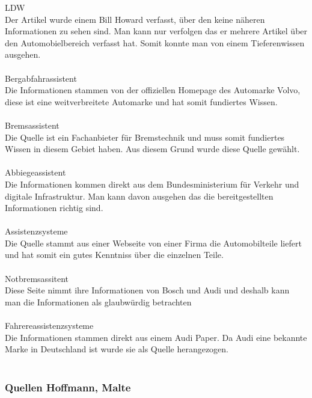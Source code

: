 LDW \cite{LDW.PB1}\\
Der Artikel wurde einem Bill Howard verfasst, über den keine näheren Informationen zu sehen sind. Man kann nur verfolgen das er mehrere Artikel über den Automobielbereich verfasst hat. 
Somit konnte man von einem Tieferenwissen ausgehen.\\\\

Bergabfahrassistent \cite{bergabfahr.PB1}\\
Die Informationen stammen von der offiziellen Homepage des Automarke Volvo, diese ist eine weitverbreitete Automarke und hat somit fundiertes Wissen.\\\\

Bremsassistent \cite{bremsassi.PB1}\\
Die Quelle ist ein Fachanbieter für Bremstechnik und muss somit fundiertes Wissen in diesem Gebiet haben. Aus diesem Grund wurde diese Quelle gewählt.\\\\

Abbiegeassistent \cite{abbiegeassi.PB1}\\
Die Informationen kommen direkt aus dem Bundesministerium für Verkehr und digitale Infrastruktur. Man kann davon ausgehen das die bereitgestellten Informationen richtig sind.\\\\

Assistenzsysteme \cite{assistenzsysteme.PB3}\\
Die Quelle stammt aus einer Webseite von einer Firma die Automobilteile liefert und hat somit ein gutes Kenntniss über die einzelnen Teile. \\\\

Notbremsassitent \cite{notbremsassi.PB2}\\
Diese Seite nimmt ihre Informationen von Bosch und Audi und deshalb kann man die Informationen als glaubwürdig betrachten\\\\

Fahrereassistenzsysteme \cite{Audi.PB1}\\
Die Informationen stammen direkt aus einem Audi Paper. Da Audi eine bekannte Marke in Deutschland ist  wurde sie als Quelle herangezogen.\\\\
\newpage
\subsubsection{Quellen Hoffmann, Malte}

